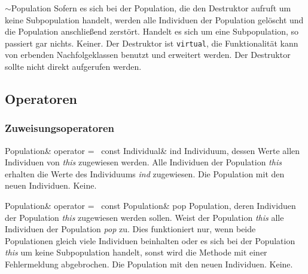 \documentclass{report}
\begin{document}
\setNormalInstance
\printEmptyMethodReturnSpecial
{}
{$\sim$Population}
{   Sofern es sich bei der Population, die den Destruktor
    aufruft um keine Subpopulation handelt, werden alle Individuen der
    Population gel\"oscht und die Population anschlie{\ss}end zerst\"ort.
    Handelt es sich um eine Subpopulation, so passiert gar nichts.}
{Keiner.}
{Der Destruktor ist {\tt virtual}, die Funktionalit\"at kann von 
                    erbenden Nachfolgeklassen benutzt und erweitert
                    werden. Der Destruktor sollte nicht direkt aufgerufen
                    werden.}

\subsection{Operatoren}

\subsubsection{Zuweisungsoperatoren}

\setNormalInstance
\printMethodWithOneParam
{Population\&}
{operator =\ }
{const Individual\&}
{ind}
{Individuum, dessen Werte allen Individuen von
                          {\em this} zugewiesen werden.}
{Alle Individuen der Population {\em this} erhalten die
    Werte des Individuums {\em ind} zugewiesen.}
{Die Population mit den neuen Individuen.}
{Keine.}

\vspace{4ex}

\setNormalInstance
\printMethodWithOneParam
{Population\&}
{operator =\ }
{const Population\&}
{pop}
{Population, deren Individuen der Population
                          {\em this} zugewiesen werden sollen.}
{Weist der Population {\em this} alle Individuen der Population {\em pop} zu.
    Dies funktioniert nur, wenn beide Populationen gleich viele
    Individuen beinhalten oder es sich bei der Population {\em this}
    um keine Subpopulation handelt, sonst wird die Methode
    mit einer Fehlermeldung abgebrochen.}
{Die Population mit den neuen Individuen.}
{Keine.}
\end{document}
